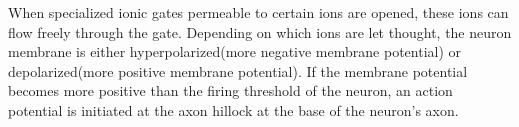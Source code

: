 		When specialized ionic gates permeable to certain ions are opened, these ions can flow freely through the gate.
		Depending on which ions are let thought, the neuron membrane is either hyperpolarized(more negative membrane potential) or depolarized(more positive membrane potential).
		If the membrane potential becomes more positive than the firing threshold of the neuron, an action potential is initiated at the axon hillock at the base of the neuron's axon. 
		\cite{PrinciplesOfNeuralScience4edKAP07}









